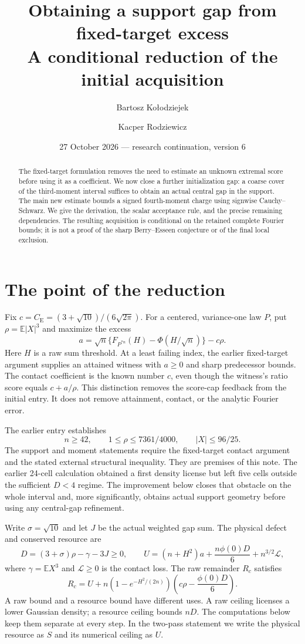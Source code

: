 \documentclass[11pt,a4paper]{article}
\title{Obtaining a support gap from fixed-target excess\\
\large A conditional reduction of the initial acquisition}
\author{Bartosz Ko\l odziejek \and Kacper Rodziewicz}
\date{27 October 2026 --- research continuation, version 6}
\newcommand{\E}{\mathbb E}
\begin{document}
\maketitle
\begin{abstract}
The fixed-target formulation removes the need to estimate an unknown
extremal score before using it as a coefficient. We now close a further
initialization gap: a coarse cover of the third-moment interval suffices
to obtain an actual central gap in the support. The main new estimate
bounds a signed fourth-moment charge using signwise Cauchy--Schwarz.
We give the derivation, the scalar acceptance rule, and the precise
remaining dependencies. The resulting acquisition is conditional on the
retained complete Fourier bounds; it is not a proof of the sharp
Berry--Esseen conjecture or of the final local exclusion.
\end{abstract}

\section{The point of the reduction}
Fix $c=C_{\mathrm E}=(3+\sqrt{10})/(6\sqrt{2\pi})$. For a centered,
variance-one law $P$, put $\rho=\E|X|^3$ and maximize the excess
\[
 a=\sqrt n\{F_{P^{*n}}(H)-\Phi(H/\sqrt n)\}-c\rho.
\]
Here $H$ is a raw sum threshold. At a least failing index, the earlier
fixed-target argument supplies an attained witness with $a\ge0$ and
sharp predecessor bounds. The contact coefficient is the known number
$c$, even though the witness's ratio score equals $c+a/\rho$.
This distinction removes the score-cap feedback from the initial entry.
It does not remove attainment, contact, or the analytic Fourier error.

The earlier entry establishes
\[
 n\ge42,\qquad 1\le\rho\le7361/4000,\qquad |X|\le96/25.
\]
The support and moment statements require the fixed-target contact
argument and the stated external structural inequality. They are premises
of this note. The earlier 24-cell calculation obtained a first density
license but left five cells outside the sufficient $D<4$ regime.
The improvement below closes that obstacle on the whole interval and,
more significantly, obtains actual support geometry before using any
central-gap refinement.

Write $\sigma=\sqrt{10}$ and let $J$ be the actual weighted gap sum.
The physical defect and conserved resource are
\[
 D=(3+\sigma)\rho-\gamma-3J\ge0,\qquad
 U=(n+H^2)a+\frac{n\phi(0)D}{6}+n^{3/2}\mathcal L,
\]
where $\gamma=\E X^3$ and $\mathcal L\ge0$ is the contact loss.
The raw remainder $R_c$ satisfies
\begin{equation}\label{v6:identity}
 R_c=U+n(1-e^{-H^2/(2n)})
                 \left(c\rho-\frac{\phi(0)D}{6}\right).
\end{equation}
A raw bound and a resource bound have different uses. A raw ceiling
licenses a lower Gaussian density; a resource ceiling bounds $nD$.
The computations below keep them separate at every step. In the two-pass
statement we write the physical resource as $S$ and its numerical ceiling
as $U$.
\end{document}
